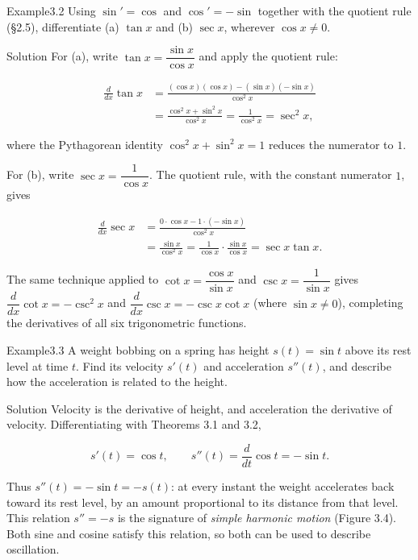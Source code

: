 \documentclass[a4paper,12pt,oneside]{memoir}
\begin{document}
\begin{workedexample}
\begin{envexample}{Example}{3.2}{}
Using \(\sin' = \cos\) and \(\cos' = -\sin\) together with the quotient rule (§2.5), differentiate (a) \(\tan x\) and (b) \(\sec x\), wherever \(\cos x \ne 0\).
\end{envexample}
\begin{envsolution}{Solution}{}{}
For (a), write \(\tan x = \dfrac{\sin x}{\cos x}\) and apply the quotient rule:

\[ \begin{aligned}
          \frac{d}{dx}\tan x
            &= \frac{(\cos x)(\cos x) - (\sin x)(-\sin x)}{\cos^{2} x} \\[2pt]
            &= \frac{\cos^{2} x + \sin^{2} x}{\cos^{2} x}
             = \frac{1}{\cos^{2} x} = \sec^{2} x,
        \end{aligned} \]

where the Pythagorean identity \(\cos^{2} x + \sin^{2} x = 1\) reduces the numerator to \(1\).

For (b), write \(\sec x = \dfrac{1}{\cos x}\). The quotient rule, with the constant numerator \(1\), gives

\[ \begin{aligned}
          \frac{d}{dx}\sec x
            &= \frac{0 \cdot \cos x - 1 \cdot (-\sin x)}{\cos^{2} x} \\[2pt]
            &= \frac{\sin x}{\cos^{2} x}
             = \frac{1}{\cos x}\cdot\frac{\sin x}{\cos x}
             = \sec x \tan x.
        \end{aligned} \]

The same technique applied to \(\cot x = \dfrac{\cos x}{\sin x}\) and \(\csc x = \dfrac{1}{\sin x}\) gives \(\dfrac{d}{dx}\cot x = -\csc^{2} x\) and \(\dfrac{d}{dx}\csc x = -\csc x \cot x\) (where \(\sin x \ne 0\)), completing the derivatives of all six trigonometric functions.
\end{envsolution}
\end{workedexample}
\begin{workedexample}
\begin{envexample}{Example}{3.3}{}
A weight bobbing on a spring has height \(s(t) = \sin t\) above its rest level at time \(t\). Find its velocity \(s'(t)\) and acceleration \(s''(t)\), and describe how the acceleration is related to the height.
\end{envexample}
\begin{envsolution}{Solution}{}{}
Velocity is the derivative of height, and acceleration the derivative of velocity. Differentiating with Theorems 3.1 and 3.2,

\[ s'(t) = \cos t, \qquad s''(t) = \frac{d}{dt}\cos t = -\sin t. \]

Thus \(s''(t) = -\sin t = -s(t)\): at every instant the weight accelerates back toward its rest level, by an amount proportional to its distance from that level. This relation \(s'' = -s\) is the signature of \emph{simple harmonic motion} (Figure 3.4). Both sine and cosine satisfy this relation, so both can be used to describe oscillation.
\end{envsolution}
\end{workedexample}
\end{document}
